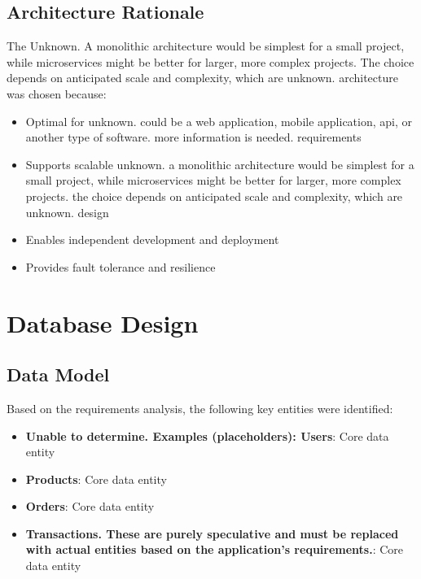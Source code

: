 \documentclass[11pt,a4paper,oneside]{article}
\begin{document}
\subsection{Architecture Rationale}

The Unknown.  A monolithic architecture would be simplest for a small project, while microservices might be better for larger, more complex projects.  The choice depends on anticipated scale and complexity, which are unknown. architecture was chosen because:
\begin{itemize}
\item Optimal for unknown. could be a web application, mobile application, api, or another type of software. more information is needed. requirements
\item Supports scalable unknown. a monolithic architecture would be simplest for a small project, while microservices might be better for larger, more complex projects. the choice depends on anticipated scale and complexity, which are unknown. design
\item Enables independent development and deployment
\item Provides fault tolerance and resilience
\end{itemize}

\section{Database Design}

\subsection{Data Model}

Based on the requirements analysis, the following key entities were identified:
\begin{itemize}
\item \textbf{Unable to determine. Examples (placeholders): Users}: Core data entity
\item \textbf{Products}: Core data entity
\item \textbf{Orders}: Core data entity
\item \textbf{Transactions. These are purely speculative and must be replaced with actual entities based on the application's requirements.}: Core data entity
\end{itemize}
\end{document}

